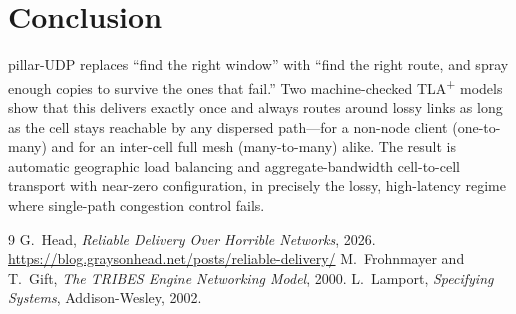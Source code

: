 \documentclass[10pt,twocolumn]{article}
\begin{document}
\section{Conclusion}
pillar-UDP replaces ``find the right window'' with ``find the right route, and
spray enough copies to survive the ones that fail.'' Two machine-checked
TLA\textsuperscript{+} models show that this delivers exactly once and always
routes around lossy links as long as the cell stays reachable by any dispersed
path---for a non-node client (one-to-many) and for an inter-cell full mesh
(many-to-many) alike. The result is automatic geographic load balancing and
aggregate-bandwidth cell-to-cell transport with near-zero configuration, in
precisely the lossy, high-latency regime where single-path congestion control
fails.

\begin{thebibliography}{9}
\small
{} G.~Head, \emph{Reliable Delivery Over Horrible Networks},
2026. \url{https://blog.graysonhead.net/posts/reliable-delivery/}
 M.~Frohnmayer and T.~Gift, \emph{The TRIBES Engine Networking
Model}, 2000.
 L.~Lamport, \emph{Specifying Systems}, Addison-Wesley, 2002.
\end{thebibliography}
\end{document}
